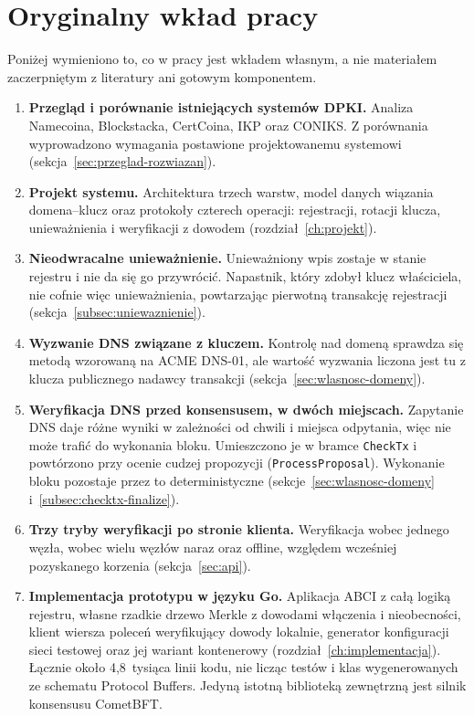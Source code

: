 \section{Oryginalny wkład pracy}
\label{sec:wklad}

Poniżej wymieniono to, co w pracy jest wkładem własnym, a nie materiałem zaczerpniętym z literatury ani gotowym komponentem.

\begin{enumerate}
    \item \textbf{Przegląd i porównanie istniejących systemów DPKI.} Analiza Namecoina, Blockstacka, CertCoina, IKP oraz CONIKS. Z porównania wyprowadzono wymagania postawione projektowanemu systemowi (sekcja~\ref{sec:przeglad-rozwiazan}).

    \item \textbf{Projekt systemu.} Architektura trzech warstw, model danych wiązania domena--klucz oraz protokoły czterech operacji: rejestracji, rotacji klucza, unieważnienia i weryfikacji z dowodem (rozdział~\ref{ch:projekt}).

    \item \textbf{Nieodwracalne unieważnienie.} Unieważniony wpis zostaje w stanie rejestru i nie da się go przywrócić. Napastnik, który zdobył klucz właściciela, nie cofnie więc unieważnienia, powtarzając pierwotną transakcję rejestracji (sekcja~\ref{subsec:uniewaznienie}).

    \item \textbf{Wyzwanie DNS związane z kluczem.} Kontrolę nad domeną sprawdza się metodą wzorowaną na ACME DNS-01, ale wartość wyzwania liczona jest tu z klucza publicznego nadawcy transakcji (sekcja~\ref{sec:wlasnosc-domeny}).

    \item \textbf{Weryfikacja DNS przed konsensusem, w dwóch miejscach.} Zapytanie DNS daje różne wyniki w zależności od chwili i miejsca odpytania, więc nie może trafić do wykonania bloku. Umieszczono je w bramce \texttt{CheckTx} i powtórzono przy ocenie cudzej propozycji (\texttt{ProcessProposal}). Wykonanie bloku pozostaje przez to deterministyczne (sekcje~\ref{sec:wlasnosc-domeny} i~\ref{subsec:checktx-finalize}).

    \item \textbf{Trzy tryby weryfikacji po stronie klienta.} Weryfikacja wobec jednego węzła, wobec wielu węzłów naraz oraz offline, względem wcześniej pozyskanego korzenia (sekcja~\ref{sec:api}).

    \item \textbf{Implementacja prototypu w języku Go.} Aplikacja ABCI z całą logiką rejestru, własne rzadkie drzewo Merkle z dowodami włączenia i nieobecności, klient wiersza poleceń weryfikujący dowody lokalnie, generator konfiguracji sieci testowej oraz jej wariant kontenerowy (rozdział~\ref{ch:implementacja}). Łącznie około 4,8~tysiąca linii kodu, nie licząc testów i klas wygenerowanych ze schematu Protocol Buffers. Jedyną istotną biblioteką zewnętrzną jest silnik konsensusu CometBFT.


\end{enumerate}
